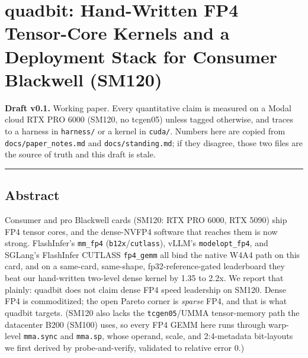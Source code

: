 \documentclass[
]{article}
\author{}
\date{}
\begin{document}
\section{quadbit: Hand-Written FP4 Tensor-Core Kernels and a Deployment
Stack for Consumer Blackwell
(SM120)}\label{quadbit-hand-written-fp4-tensor-core-kernels-and-a-deployment-stack-for-consumer-blackwell-sm120}

\textbf{Draft v0.1.} Working paper. Every quantitative claim is measured
on a Modal cloud RTX PRO 6000 (SM120, no tcgen05) unless tagged
otherwise, and traces to a harness in \texttt{harness/} or a kernel in
\texttt{cuda/}. Numbers here are copied from
\texttt{docs/paper\_notes.md} and \texttt{docs/standing.md}; if they
disagree, those two files are the source of truth and this draft is
stale.

\begin{center}\rule{0.5\linewidth}{0.5pt}\end{center}

\subsection{Abstract}\label{abstract}

Consumer and pro Blackwell cards (SM120: RTX PRO 6000, RTX 5090) ship
FP4 tensor cores, and the dense-NVFP4 software that reaches them is now
strong. FlashInfer's \texttt{mm\_fp4} (\texttt{b12x}/\texttt{cutlass}),
vLLM's \texttt{modelopt\_fp4}, and SGLang's FlashInfer CUTLASS
\texttt{fp4\_gemm} all bind the native W4A4 path on this card, and on a
same-card, same-shape, fp32-reference-gated leaderboard they beat our
hand-written two-level dense kernel by 1.35 to 2.2x. We report that
plainly: quadbit does not claim dense FP4 speed leadership on SM120.
Dense FP4 is commoditized; the open Pareto corner is \emph{sparse} FP4,
and that is what quadbit targets. (SM120 also lacks the
\texttt{tcgen05}/UMMA tensor-memory path the datacenter B200 (SM100)
uses, so every FP4 GEMM here runs through warp-level \texttt{mma.sync}
and \texttt{mma.sp}, whose operand, scale, and 2:4-metadata bit-layouts
we first derived by probe-and-verify, validated to relative error 0.)
\end{document}
